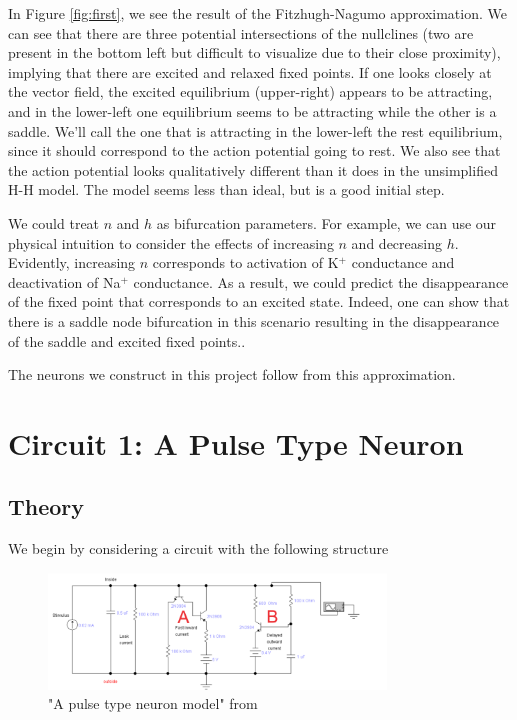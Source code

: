\documentclass[12]{book}
\newcommand\0{\mathbf{0}}
\newcommand\<{\langle}
\renewcommand\>{\rangle}
\begin{document}
In Figure \ref{fig:first}, we see the result of the Fitzhugh-Nagumo approximation. We can see that there are three potential intersections of the nullclines (two are present in the bottom left but difficult to visualize due to their close proximity), implying that there are excited and relaxed fixed points. If one looks closely at the vector field, the excited equilibrium (upper-right) appears to be attracting, and in the lower-left one equilibrium seems to be attracting while the other is a saddle. We'll call the one that is attracting in the lower-left the rest equilibrium, since it should correspond to the action potential going to rest. We also see that the action potential looks qualitatively different than it does in the unsimplified H-H model. The model seems less than ideal, but is a good initial step. 

We could treat $n$ and $h$ as bifurcation parameters. For example, we can use our physical intuition to consider the effects of increasing $n$ and decreasing $h$. Evidently, increasing $n$ corresponds to activation of K$^+$ conductance and deactivation of Na$^+$ conductance. As a result, we could predict the disappearance of the fixed point that corresponds to an excited state. Indeed, one can show that there is a saddle node bifurcation in this scenario resulting in the disappearance of the saddle and excited fixed points.\cite{keener}.

The neurons we construct in this project follow from this approximation.

\section{Circuit 1: A Pulse Type Neuron}
\label{sec:pulse-neuron}

\subsection{Theory}
 
 We begin by considering a circuit with the following structure
 
\begin{figure}[H]
\label{fig:maeda-pulse}
\centering
\includegraphics[width=0.8\textwidth]{exercise1-0}
\caption{"A pulse type neuron model" from \cite{maeda2000pulse}}
\end{figure}
\end{document}
